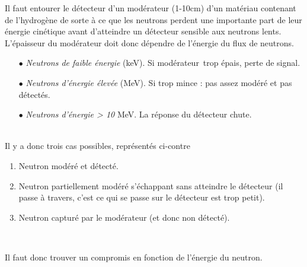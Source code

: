 Il faut entourer le détecteur d'un modérateur (1-10cm) d'un matériau contenant de l'hydrogène de sorte
à ce que les neutrons perdent une importante part de leur énergie cinétique avant d'atteindre un
détecteur sensible aux neutrons lents. L'épaisseur du modérateur doit donc dépendre de l'énergie
du flux de neutrons.
\begin{itemize}
\item[$\bullet$] \textit{Neutrons de faible énergie} (keV). Si modérateur\ trop épais, perte de signal.

\item[$\bullet$] \textit{Neutrons d'énergie élevée} (MeV). Si trop mince : pas assez modéré et 
pas détectés.
\item[$\bullet$] \textit{Neutrons d'énergie > 10} MeV. La réponse du détecteur chute.
\end{itemize}\ \\

Il y a donc trois cas possibles, représentés ci-contre
\begin{enumerate}
\item Neutron modéré et détecté.
\item Neutron partiellement modéré s'échappant sans atteindre le détecteur (il passe à travers, 
c'est ce qui se passe sur le détecteur est trop petit).
\item Neutron capturé par le modérateur (et donc non détecté).
\end{enumerate}\ 

Il faut donc trouver un compromis en fonction de l'énergie du neutron.

\newpage
